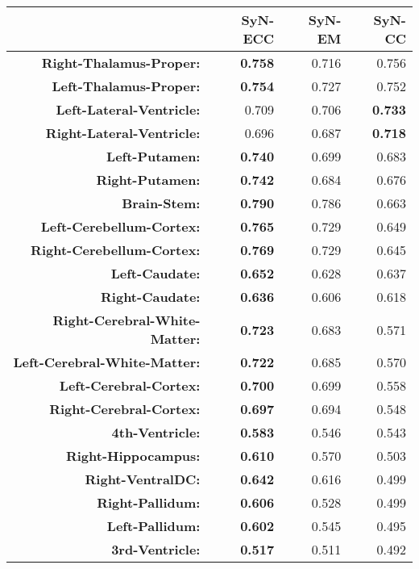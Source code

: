 \begin{table}[htbp]
  \centering
  {\small
    \begin{tabular}{rrrr}
    \toprule
          & \textbf{SyN-ECC} & \textbf{SyN-EM} & \textbf{SyN-CC} \\
    \midrule
    \textbf{Right-Thalamus-Proper:} & \textbf{0.758} & 0.716 & 0.756 \\
    \textbf{Left-Thalamus-Proper:} & \textbf{0.754} & 0.727 & 0.752 \\
    \textbf{Left-Lateral-Ventricle:} & 0.709 & 0.706 & \textbf{0.733} \\
    \textbf{Right-Lateral-Ventricle:} & 0.696 & 0.687 & \textbf{0.718} \\
    \textbf{Left-Putamen:} & \textbf{0.740} & 0.699 & 0.683 \\
    \textbf{Right-Putamen:} & \textbf{0.742} & 0.684 & 0.676 \\
    \textbf{Brain-Stem:} & \textbf{0.790} & 0.786 & 0.663 \\
    \textbf{Left-Cerebellum-Cortex:} & \textbf{0.765} & 0.729 & 0.649 \\
    \textbf{Right-Cerebellum-Cortex:} & \textbf{0.769} & 0.729 & 0.645 \\
    \textbf{Left-Caudate:} & \textbf{0.652} & 0.628 & 0.637 \\
    \textbf{Right-Caudate:} & \textbf{0.636} & 0.606 & 0.618 \\
    \textbf{Right-Cerebral-White-Matter:} & \textbf{0.723} & 0.683 & 0.571 \\
    \textbf{Left-Cerebral-White-Matter:} & \textbf{0.722} & 0.685 & 0.570 \\
    \textbf{Left-Cerebral-Cortex:} & \textbf{0.700} & 0.699 & 0.558 \\
    \textbf{Right-Cerebral-Cortex:} & \textbf{0.697} & 0.694 & 0.548 \\
    \textbf{4th-Ventricle:} & \textbf{0.583} & 0.546 & 0.543 \\
    \textbf{Right-Hippocampus:} & \textbf{0.610} & 0.570 & 0.503 \\
    \textbf{Right-VentralDC:} & \textbf{0.642} & 0.616 & 0.499 \\
    \textbf{Right-Pallidum:} & \textbf{0.606} & 0.528 & 0.499 \\
    \textbf{Left-Pallidum:} & \textbf{0.602} & 0.545 & 0.495 \\
    \textbf{3rd-Ventricle:} & \textbf{0.517} & 0.511 & 0.492 \\

\end{tabular}}
\end{table}
